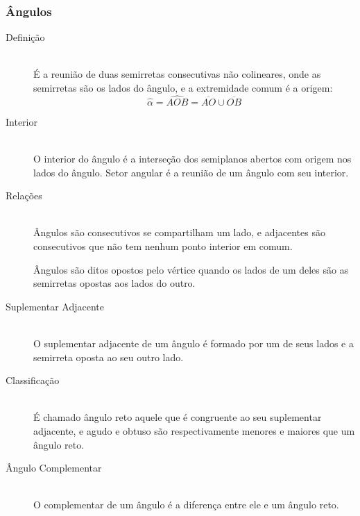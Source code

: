     \subsubsection{Ângulos}
        \begin{description}
            \item[Definição] \hfill \\
                É a reunião de duas semirretas consecutivas não colineares, onde as semirretas são os lados do ângulo, e a extremidade comum é a origem:
                \[ \hat{\alpha} = \hat{AOB} = \overline{AO} \cup \overline{OB} \]
            \item[Interior] \hfill \\
                O interior do ângulo é a interseção dos semiplanos abertos com origem nos lados do ângulo. Setor angular é a reunião de um ângulo com seu interior.
            \item[Relações] \hfill \\
                Ângulos são consecutivos se compartilham um lado, e adjacentes são consecutivos que não tem nenhum ponto interior em comum. 
                
                Ângulos são ditos opostos pelo vértice quando os lados de um deles são as semirretas opostas aos lados do outro.
            \item[Suplementar Adjacente] \hfill \\
                O suplementar adjacente de um ângulo é formado por um de seus lados e  a semirreta oposta ao seu outro lado.
            \item[Classificação] \hfill \\
                É chamado ângulo reto aquele que é congruente ao seu suplementar adjacente, e agudo e obtuso são respectivamente menores e maiores que um ângulo reto.
            \item[Ângulo Complementar] \hfill \\
                O complementar de um ângulo é a diferença entre ele e um ângulo reto.
                \begin{center}
\end{center}
\end{description}
